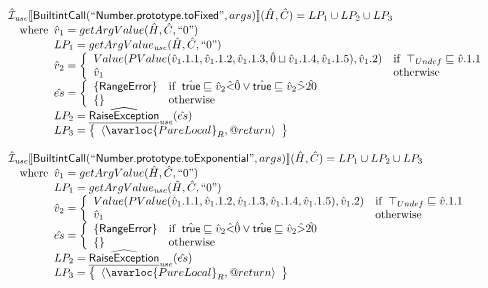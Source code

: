 \[\begin{array}{l}
\aI_{\it use}\lbr \SF{BuiltintCall}(``\SF{Number.prototype.toFixed}",args)\rbr(\hat{H},\hat{C}) = LP_1 \cup LP_2 \cup LP_3\\
\quad\wherec{
  \hat{v}_1 = getArgValue(\hat{H}, \hat{C}, ``0")\\
  LP_1 = getArgValue_{\it use}(\hat{H}, \hat{C}, ``0")\\
  \hat{v}_2 = \left\{\begin{array}{ll}
      Value(PValue(\hat{v}_1.1.1,\hat{v}_1.1.2,\hat{v}_1.1.3,
        \hat{0} \sqcup \hat{v}_1.1.4,\hat{v}_1.1.5), \hat{v}_1.2)
      & \ifc{\top_{Undef} \sqsubseteq \hat{v}.1.1}\\
      \hat{v}_1 & \owc
    \end{array}\right.\\
  \hat{es} = \left\{\begin{array}{ll}
      \{ \SF{RangeError} \}
      & \ifc{\atrue \sqsubseteq \hat{v}_2 \hat{<} \hat{0} \lor \atrue \sqsubseteq \hat{v}_2 \hat{>} \hat{20}}\\
      \set{} & \owc
    \end{array}\right.\\
  LP_2 = \ahf{RaiseException}_{\it use}(\hat{es})\\
  LP_3 = \set{\langle\avarloc{PureLocal}_R,\varprop{return}\rangle}\\
  }\\
\\


\aI_{\it use}\lbr \SF{BuiltintCall}(``\SF{Number.prototype.toExponential}",args)\rbr(\hat{H},\hat{C}) = LP_1 \cup LP_2 \cup LP_3\\
\quad\wherec{
  \hat{v}_1 =getArgValue(\hat{H}, \hat{C}, ``0")\\
  LP_1 = getArgValue_{\it use}(\hat{H}, \hat{C}, ``0")\\
  \hat{v}_2 = \left\{\begin{array}{ll}
      Value(PValue(\hat{v}_1.1.1,\hat{v}_1.1.2,\hat{v}_1.1.3,
        \hat{v}_1.1.4,\hat{v}_1.1.5), \hat{v}_1.2)
      & \ifc{\top_{Undef} \sqsubseteq \hat{v}.1.1}\\
      \hat{v}_1 & \owc
    \end{array}\right.\\
  \hat{es} = \left\{\begin{array}{ll}
      \{ \SF{RangeError} \}
      & \ifc{\atrue \sqsubseteq \hat{v}_2 \hat{<} \hat{0} \lor \atrue \sqsubseteq \hat{v}_2 \hat{>} \hat{20}}\\
      \set{} & \owc
    \end{array}\right.\\
  LP_2 = \ahf{RaiseException}_{\it use}(\hat{es})\\
  LP_3 = \set{\langle\avarloc{PureLocal}_R,\varprop{return}\rangle}\\
  }\\
\\



\end{array}\]

